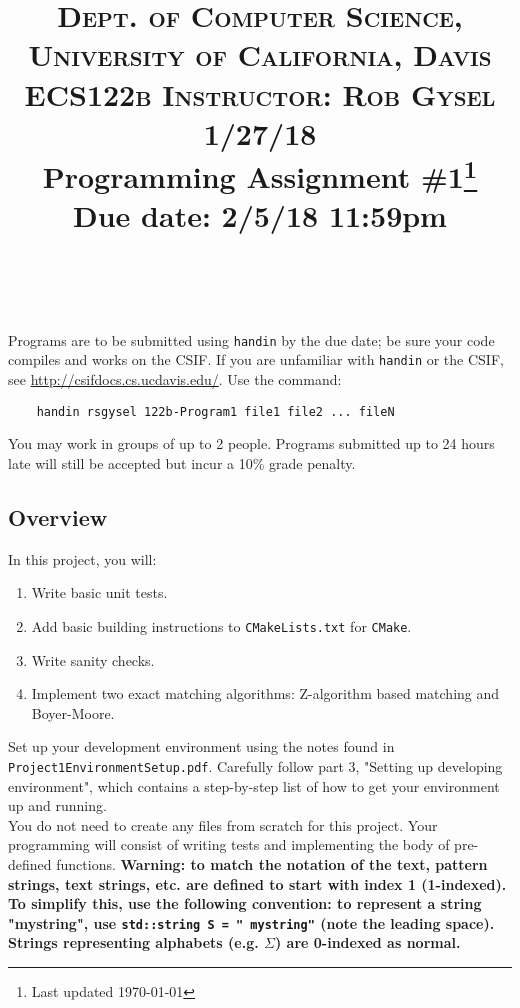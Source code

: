 \documentclass[paper=a4, fontsize=11pt]{scrartcl} %
\title{	
\normalfont \normalsize 
\textsc{Dept. of Computer Science, University of California, Davis\\ECS122b \hspace{.5in} Instructor: Rob Gysel \hspace{.5in} 1/27/18} %
\horrule{0.5pt} \\[0.4cm] %
\huge Programming Assignment \#1\footnote{Last updated \today}\\Due date: 2/5/18 11:59pm \\ %
\horrule{2pt} \\[0.5cm] %
}
\author{} %
\date{}
\numberwithin{equation}{section} %
\numberwithin{figure}{section} %
\numberwithin{table}{section} %
\begin{document}
\maketitle %
\vspace{-3cm}

Programs are to be submitted using \texttt{handin} by the due date; be sure your code compiles and works on the CSIF. If you are unfamiliar with \texttt{handin} or the CSIF, see \url{http://csifdocs.cs.ucdavis.edu/}. Use the command:

\begin{verbatim}
	handin rsgysel 122b-Program1 file1 file2 ... fileN
\end{verbatim}

You may work in groups of up to 2 people.
Programs submitted up to 24 hours late will still be accepted but incur a 10\% grade penalty.

\subsection*{Overview}
In this project, you will:
\begin{enumerate}
	\item Write basic unit tests.
	\item Add basic building instructions to \texttt{CMakeLists.txt} for \texttt{CMake}.
	\item Write sanity checks.
	\item Implement two exact matching algorithms: Z-algorithm based matching and Boyer-Moore.
\end{enumerate}

Set up your development environment using the notes found in \texttt{Project1EnvironmentSetup.pdf}.
Carefully follow part 3, "Setting up developing environment", which contains a step-by-step list of how to get your environment up and running.\\

You do not need to create any files from scratch for this project.
Your programming will consist of writing tests and implementing the body of pre-defined functions.
\textbf{Warning: to match the notation of the text, pattern strings, text strings, etc. are defined to start with index 1 (1-indexed).
To simplify this, use the following convention: to represent a string "mystring", use \texttt{std::string S = " mystring"} (note the leading space).
Strings representing alphabets (e.g. $\Sigma$) are 0-indexed as normal.}
\end{document}
